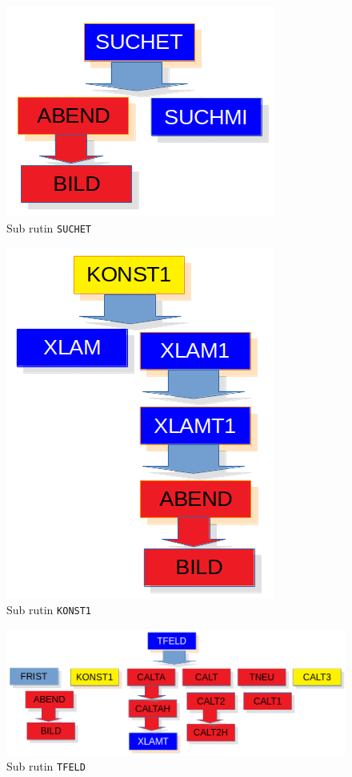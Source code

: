 \documentclass[a4paper,11pt]{report}
\begin{document}
\begin{figure}[h!]
  \begin{center}
    \includegraphics[scale=.5]{../suchet.png}
    \caption{Sub rutin \texttt{SUCHET}}
    \label{fig:suchet}
  \end{center}
\end{figure}

\begin{figure}[h!]
  \begin{center}
    \includegraphics[scale=.5]{../konst1.png}
    \caption{Sub rutin \texttt{KONST1}}
    \label{fig:konst1}
  \end{center}
\end{figure}

\begin{figure}[h!]
  \begin{center}
    \includegraphics[scale=.5]{../tfeld.png}
    \caption{Sub rutin \texttt{TFELD}}
    \label{fig:tfeld}
  \end{center}
\end{figure}
\end{document}
